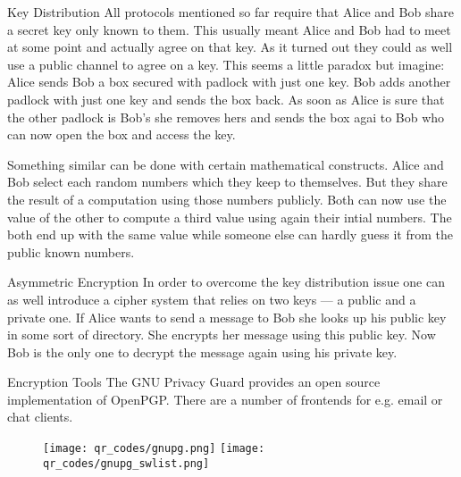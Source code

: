 \documentclass[final,hyperref={pdfpagelabels=false}]{beamer}
\begin{document}
\begin{frame}{}
\begin{columns}[t]
\begin{column}{.32\linewidth}
        \begin{block}{Key Distribution}
          All protocols mentioned so far require that Alice and Bob share a secret key only known to them. This usually meant Alice and Bob had to meet at some point and actually agree on that key. As it turned out they could as well use a public channel to agree on a key.
          This seems a little paradox but imagine: Alice sends Bob a box secured with padlock with just one key. Bob adds another padlock with just one key and sends the box back. As soon as Alice is sure that the other padlock is Bob's she removes hers and sends the box agai to Bob who can now open the box and access the key.  \par
          Something similar can be done with certain mathematical constructs. Alice and Bob select each random numbers which they keep to themselves. But they share the result of a computation using those numbers publicly. Both can now use the value of the other to compute a third value using again their intial numbers. The both end up with the same value while someone else can hardly guess it from the public known numbers. 
        \end{block}
 
        \begin{block}{Asymmetric Encryption}
          In order to overcome the key distribution issue one can as well introduce a cipher system that relies on two keys --- a public and a private one. If Alice wants to send a message to Bob she looks up his public key in some sort of directory. She encrypts her message using this public key. Now Bob is the only one to decrypt the message again using his private key.
        \end{block}


        \begin{block}{Encryption Tools}
        The GNU Privacy Guard provides an open source implementation of OpenPGP. There are a number of frontends for e.g. email or chat clients.
        \begin{figure}
          \center
            \texttt{[image: qr\_codes/gnupg.png]} \hspace{20pt}
            \texttt{[image: qr\_codes/gnupg\_swlist.png]}
        \end{figure}
        \end{block}
      \end{column}
    \end{columns}
  \end{frame}
\end{document}
